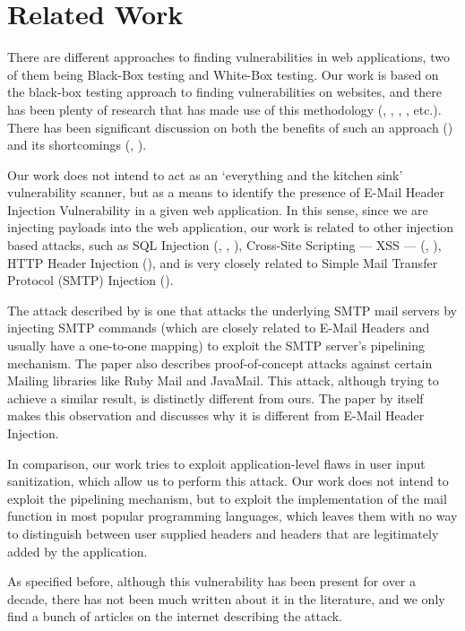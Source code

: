 \chapter{Related Work}

There are different approaches to finding vulnerabilities in web applications, two of them being Black-Box testing and White-Box testing.
Our work is based on the black-box testing approach to finding vulnerabilities on websites, and there has been plenty of research that has made use of this methodology (\cite{Beizer:1995:BTT:202699}, \cite{Huang}, \cite{zanero2005automatic}, \cite{kals2006secubat}, \cite{payet13:ears-in-the-wild} etc.). There has been significant discussion on both the benefits of such an approach (\cite{black-box}) and its shortcomings (\cite{Doupe2010}, \cite{Doupe2012}).

Our work does not intend to act as an `everything and the kitchen sink' vulnerability scanner, but as a means to identify the presence of E-Mail Header Injection Vulnerability in a given web application. In this sense, since we are injecting payloads into the web application, our work is related to other injection based attacks, such as SQL Injection (\cite{sql1}, \cite{sql0}, \cite{sql2}), Cross-Site Scripting --- XSS --- (\cite{Injection1}, \cite{KleinAmit}), HTTP Header Injection (\cite{sessionride}), and is very closely related to Simple Mail Transfer Protocol (SMTP) Injection (\cite{Terada2015}).

The attack described by \cite{Terada2015} is one that attacks the underlying SMTP mail servers by injecting SMTP commands (which are closely related to E-Mail Headers and usually have a one-to-one mapping) to exploit the SMTP server's pipelining mechanism. The paper also describes proof-of-concept attacks against certain Mailing libraries like Ruby Mail and JavaMail. This attack, although trying to achieve a similar result, is distinctly different from ours. The paper by itself makes this observation and discusses why it is different from E-Mail Header Injection.

In comparison, our work tries to exploit application-level flaws in user input sanitization, which allow us to perform this attack. Our work does not intend to exploit the pipelining mechanism, but to exploit the implementation of the mail function in most popular programming languages, which leaves them with no way to distinguish between user supplied headers and headers that are legitimately added by the application.

As specified before, although this vulnerability has been present for over a decade, there has not been much written about it in the literature, and we only find a bunch of articles on the internet describing the attack.

